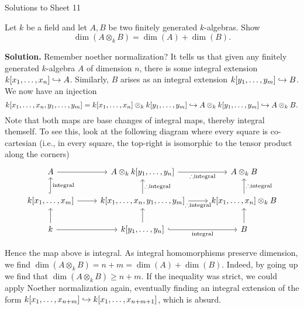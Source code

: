 \documentclass[a4paper,11pt]{article}
\begin{document}
\begin{center}
    \huge{Solutions to Sheet 11}
\end{center}

Let $k$ be a field and let $A,B$ be two finitely generated $k$-algebras.
Show 
\begin{equation*}
    \dim(A \otimes_k B) = \dim(A) + \dim(B).
\end{equation*}

\textbf{Solution.} Remember noether normalization? It tells us that given
any finitely generated $k$-algebra $A$ of dimension $n$, there is some 
integral extension $k[x_1, \dots, x_n] \hookrightarrow A$. Similarly, $B$ arises
as an integral extension $k[y_1, \dots, y_m] \hookrightarrow B$. 
We now have an injection
\begin{equation*}
    k[x_1, \dots, x_n, y_1, \dots, y_m] = k[x_1, \dots, x_n] \otimes_k k[y_1, \dots, y_m] 
    \hookrightarrow A \otimes_k k[y_1, \dots, y_m] \hookrightarrow A \otimes_k B.
\end{equation*}
Note that both maps are base changes of integral maps, thereby integral
themself. To see this, look at the following diagram where every
square is co-cartesian (i.e., in every square, the top-right is isomorphic to
the tensor product along the corners)
\begin{equation*}
\begin{tikzcd}[ampersand replacement=\&]
	A \& {A \otimes_k k[y_1, \dots, y_n] } \& {A \otimes_k B} \\
    {k[x_1, \dots, x_m]} \& {k[x_1, \dots, x_n, y_1, \dots, y_m]} \& {k[x_1, \dots, x_n] \otimes_k B} \\
	k \& {k[y_1, \dots, y_n]} \& B
	\arrow[from=3-2, to=2-2]
	\arrow[from=3-1, to=3-2]
	\arrow[from=3-1, to=2-1]
	\arrow[from=2-1, to=2-2]
	\arrow["{\text{integral}}"', hook, from=3-2, to=3-3]
	\arrow[from=3-3, to=2-3]
	\arrow["{\therefore \text{integral}}"', from=2-2, to=2-3]
	\arrow["{\text{integral}}"',hook, from=2-1, to=1-1]
	\arrow["{\therefore \text{integral}}"', from=2-2, to=1-2]
	\arrow[from=1-1, to=1-2]
	\arrow["{\therefore \text{integral}}"', from=1-2, to=1-3]
	\arrow["{\therefore \text{integral}}"', from=2-3, to=1-3]
\end{tikzcd}
\end{equation*}

Hence the map above is integral. As integral homomorphisms 
preserve dimension, we find $\dim(A \otimes_k B) = n+m = \dim(A) + \dim(B)$. 
Indeed, by going up we find that $\dim(A \otimes_k B) \geq n+m$. If 
the inequality was strict, we could apply Noether normalization again, 
eventually finding an integral extension of the form
$k[x_1, \dots, x_{n+m}] \hookrightarrow k[x_1, \dots, x_{n+m+1}]$, which is 
absurd.
\end{document}
